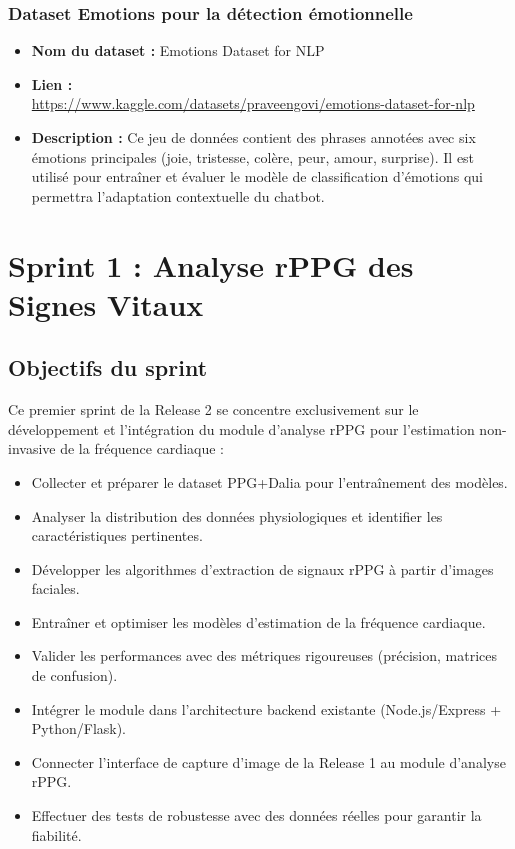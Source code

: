 \subsubsection*{Dataset Emotions pour la détection émotionnelle}
\begin{itemize}
    \item \textbf{Nom du dataset :} Emotions Dataset for NLP
    \item \textbf{Lien :} \\
    \url{https://www.kaggle.com/datasets/praveengovi/emotions-dataset-for-nlp}
    \item \textbf{Description :} Ce jeu de données contient des phrases annotées avec six émotions principales (joie, tristesse, colère, peur, amour, surprise). Il est utilisé pour entraîner et évaluer le modèle de classification d'émotions qui permettra l'adaptation contextuelle du chatbot.
\end{itemize}

\section{Sprint 1 : Analyse rPPG des Signes Vitaux}

\subsection{Objectifs du sprint}
Ce premier sprint de la Release 2 se concentre exclusivement sur le développement et l'intégration du module d'analyse rPPG pour l'estimation non-invasive de la fréquence cardiaque :
\begin{itemize}
    \item Collecter et préparer le dataset PPG+Dalia pour l'entraînement des modèles.
    \item Analyser la distribution des données physiologiques et identifier les caractéristiques pertinentes.
    \item Développer les algorithmes d'extraction de signaux rPPG à partir d'images faciales.
    \item Entraîner et optimiser les modèles d'estimation de la fréquence cardiaque.
    \item Valider les performances avec des métriques rigoureuses (précision, matrices de confusion).
    \item Intégrer le module dans l'architecture backend existante (Node.js/Express + Python/Flask).
    \item Connecter l'interface de capture d'image de la Release 1 au module d'analyse rPPG.
    \item Effectuer des tests de robustesse avec des données réelles pour garantir la fiabilité.
\end{itemize}

